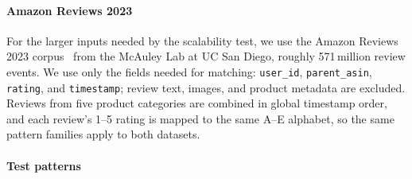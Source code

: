 \documentclass[preprint,12pt,times,a4paper]{elsarticle}
\begin{document}
\paragraph{Amazon Reviews 2023}
For the larger inputs needed by the scalability test, we use the Amazon Reviews 2023 corpus~\cite{hou2024amazonreviews} from the
McAuley Lab at UC San Diego, roughly 571\,million review events. We use only the fields needed for matching: \texttt{user\_id},
\texttt{parent\_asin}, \texttt{rating}, and \texttt{timestamp}; review text,
images, and product metadata are excluded. Reviews from five product categories are combined in global timestamp order, and each review's 1--5 rating is mapped to the same A--E
alphabet, so the same pattern families apply to both datasets.

\paragraph{Test patterns}
\end{document}
